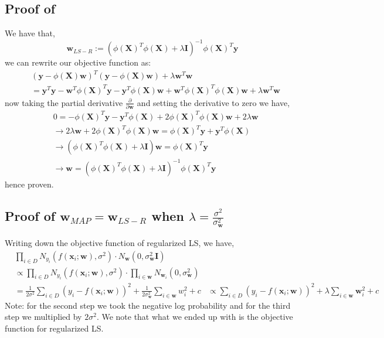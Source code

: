 \begin{appendices}
\subsection{Proof of } \label{proof:wLSR solution}
We have that,
\begin{equation}
    \bm{w}_{LS-R} := (\phi(\bm{X})^{T} \phi(\bm{X}) + \lambda \bm{I})^{-1} \phi(\bm{X})^{T} \bm{y}
\end{equation}
we can rewrite our objective function as:
\begin{align}
    &{} (\bm{y} - \phi(\bm{X}) \bm{w})^{T} (\bm{y} - \phi(\bm{X}) \bm{w}) + \lambda \bm{w}^{T} \bm{w} \\
    & = \bm{y}^{T} \bm{y} - \bm{w}^{T} \phi(\bm{X})^{T} \bm{y} - \bm{y}^{T} \phi(\bm{X}) \bm{w} + \bm{w}^{T} \phi(\bm{X})^{T} \phi(\bm{X}) \bm{w} + \lambda \bm{w}^{T} \bm{w}
\end{align}
now taking the partial derivative $\frac{\partial}{\partial \bm{w}}$ and setting the derivative to zero we have,
\begin{align}
    &{} 0 = -\phi(\bm{X})^{T} \bm{y} - \bm{y}^{T} \phi(\bm{X}) +2\phi(\bm{X})^{T} \phi(\bm{X}) \bm{w} + 2 \lambda \bm{w} \\
    & \rightarrow 2 \lambda \bm{w} + 2 \phi(\bm{X})^{T} \phi(\bm{X}) \bm{w} = \phi(\bm{X})^{T} \bm{y} + \bm{y}^{T} \phi(\bm{X}) \\
    & \rightarrow (\phi(\bm{X})^{T} \phi(\bm{X}) + \lambda \bm{I}) \bm{w} = \phi(\bm{X})^{T} \bm{y} \\
    & \rightarrow \bm{w} = (\phi(\bm{X})^{T} \phi(\bm{X}) +\lambda \bm{I})^{-1} \phi(\bm{X})^{T} \bm{y} 
\end{align}
hence proven.

\subsection{Proof of \texorpdfstring{$\bm{w}_{MAP} = \bm{w}_{LS-R}$}{TEXT} when \texorpdfstring{$\lambda = \frac{\sigma^{2}}{\sigma_{\bm{w}}^{2}}$}{TEXT}} \label{proof:w-MAP equals w-LS-R}
Writing down the objective function of regularized LS, we have,
\begin{align}
    &{} \prod_{i \in D} N_{y_{i}} (f(\bm{x}_{i};\bm{w}), \sigma^{2}) \cdot N_{\bm{w}}(0,\sigma_{\bm{w}}^{2} \bm{I}) \\
    & \propto \prod_{i \in D} N_{y_{i}} (f(\bm{x}_{i};\bm{w}),\sigma^{2}) \cdot \prod_{i \in \bm{w}} N_{\bm{w}_{i}} (0,\sigma_{\bm{w}}^{2}) \\
    & = \frac{1}{2 \sigma^{2}} \sum_{i \in D} (y_{i} - f(\bm{x}_{i};\bm{w}))^{2} + \frac{1}{2 \sigma_{\bm{w}}^{2}} \sum_{i \in \bm{w}} w_{i}^{2} +c
    & \propto \sum_{i \in D} (y_{i} -f(\bm{x}_{i}; \bm{w}))^{2} + \lambda \sum_{i \in \bm{w}} \bm{w}_{i}^{2} + c
\end{align}
Note: for the second step we took the negative log probability and for the third step we multiplied by $2 \sigma^{2}$. We note that what we ended up with is the objective function for regularized LS.


\end{appendices}
